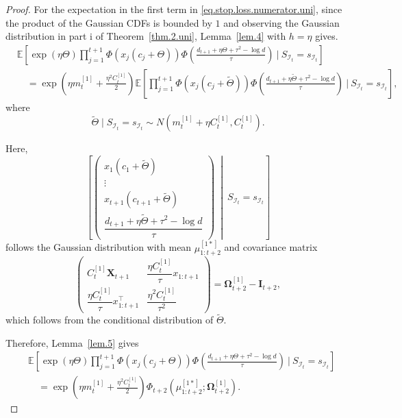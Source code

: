 \documentclass[11pt,authoryear]{elsarticle}
\def\E#1{{\mathbb E}\left[#1\right]}
\theoremstyle{nopunct}
\numberwithin{equation}{section}
\begin{document}
\begin{proof}
For the expectation in the first term in
\eqref{eq.stop.loss.numerator.uni}, since the product of the Gaussian
CDFs is bounded by \(1\) and observing the Gaussian distribution in
part i of Theorem~\ref{thm.2.uni}, Lemma~\ref{lem.4} with \(h=\eta\) gives.
\[
\begin{aligned}
&\E{
\exp(\eta\Theta)
\prod_{j=1}^{t+1}
\Phi\left(
x_j(c_j+\Theta)
\right)
\Phi\left(
\frac{
d_{t+1}+\eta\Theta+\tau^2-\log d
}{\tau}
\right)
\ \bigg|\
S_{\mathcal I_t}=s_{\mathcal I_t}
}\\
&\quad=
\exp\left(
\eta m_t^{[1]}+\frac{\eta^2C_t^{[1]}}{2}
\right)
\E{
\prod_{j=1}^{t+1}
\Phi\left(
x_j(c_j+\widetilde{\Theta})
\right)
\Phi\left(
\frac{
d_{t+1}+\eta\widetilde{\Theta}+\tau^2-\log d
}{\tau}
\right)
\ \bigg|\
S_{\mathcal I_t}=s_{\mathcal I_t}
},
\end{aligned}
\]
where
\[
\widetilde{\Theta}
\mid
S_{\mathcal I_t}=s_{\mathcal I_t}
\sim
N(m_t^{[1]}+\eta C_t^{[1]},C_t^{[1]}).
\]

Here,
\[
\left[
\begin{pmatrix}
x_1(c_1+\widetilde{\Theta})\\
\vdots\\
x_{t+1}(c_{t+1}+\widetilde{\Theta})\\[0.15cm]
\dfrac{
d_{t+1}+\eta\widetilde{\Theta}+\tau^2-\log d
}{\tau}
\end{pmatrix}
\ \middle|\
S_{\mathcal I_t}=s_{\mathcal I_t}
\right]
\]
follows the Gaussian distribution with mean
\(\mu_{1:t+2}^{[1*]}\) and covariance matrix
\[
\begin{pmatrix}
C_t^{[1]}\boldsymbol X_{t+1}
&
\dfrac{\eta C_t^{[1]}}{\tau}x_{1:t+1}
\\[0.4cm]
\dfrac{\eta C_t^{[1]}}{\tau}x_{1:t+1}^{\top}
&
\dfrac{\eta^2C_t^{[1]}}{\tau^2}
\end{pmatrix}
=
\boldsymbol\Omega_{t+2}^{[1]}-\boldsymbol I_{t+2},
\]
which follows from the conditional distribution of
\(\widetilde{\Theta}\).

Therefore, Lemma~\ref{lem.5} gives
\begin{equation}\label{eq.stop.loss.first.uni}
\begin{aligned}
&\E{
\exp(\eta\Theta)
\prod_{j=1}^{t+1}
\Phi\left(
x_j(c_j+\Theta)
\right)
\Phi\left(
\frac{
d_{t+1}+\eta\Theta+\tau^2-\log d
}{\tau}
\right)
\ \bigg|\
S_{\mathcal I_t}=s_{\mathcal I_t}
}\\
&\quad=
\exp\left(
\eta m_t^{[1]}+\frac{\eta^2C_t^{[1]}}{2}
\right)
\Phi_{t+2}
\left(
\mu_{1:t+2}^{[1*]};
\boldsymbol\Omega_{t+2}^{[1]}
\right).
\end{aligned}
\end{equation}


\end{proof}
\end{document}
